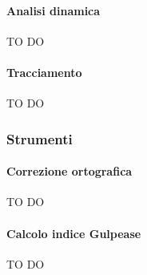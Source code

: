			\paragraph{Analisi dinamica} %
			\label{par:analisi_dinamica}
			TO DO

			\paragraph{Tracciamento} %
			\label{par:tracciamento}
			TO DO
			
			
			
		\subsubsection{Strumenti} %
		\label{ssub:strumenti}
			\paragraph{Correzione ortografica} %
			\label{par:correzione_ortografica}
			TO DO
			
			\paragraph{Calcolo indice Gulpease} %
			\label{par:calcolo_indice_gulpease}
			TO DO




